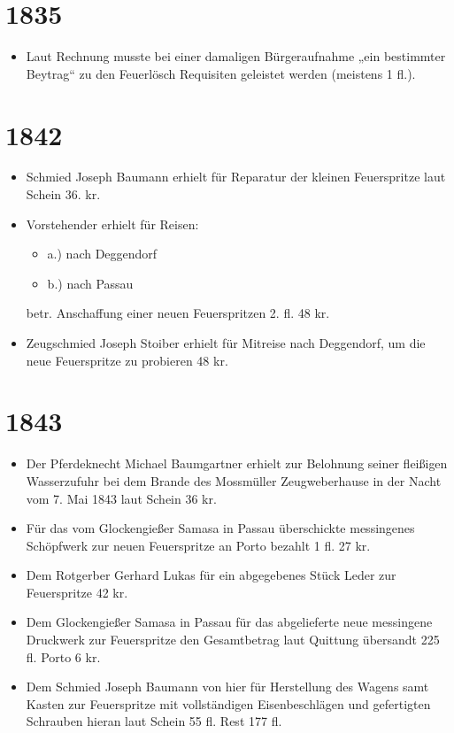 \documentclass[12pt,a4paper]{book}
\begin{document}
\section*{1835}

\begin{itemize}
\item Laut Rechnung musste bei einer damaligen Bürgeraufnahme „ein
bestimmter Beytrag“ zu den Feuerlösch Requisiten geleistet werden
(meistens 1 fl.).
\end{itemize}

\section*{1842}

\begin{itemize}
\item Schmied Joseph Baumann erhielt für Reparatur der kleinen
Feuerspritze laut Schein 36. kr.

\item Vorstehender erhielt für Reisen:

\begin{itemize}
\item a.) nach Deggendorf
\item b.) nach Passau
\end{itemize}

betr. Anschaffung einer neuen Feuerspritzen 2. fl. 48 kr.

\item  Zeugschmied Joseph Stoiber erhielt für Mitreise nach Deggendorf,
um die neue Feuerspritze zu probieren 48 kr.
\end{itemize}

\section*{1843}

\begin{itemize}
\item Der Pferdeknecht Michael Baumgartner erhielt zur Belohnung seiner
fleißigen Wasserzufuhr bei dem Brande des Mossmüller Zeugweberhause in
der Nacht vom 7. Mai 1843 laut Schein 36 kr.

\item Für das vom Glockengießer Samasa in Passau überschickte
messingenes Schöpfwerk zur neuen Feuerspritze an Porto bezahlt 1 fl. 27
kr.

\item Dem Rotgerber Gerhard Lukas für ein abgegebenes Stück Leder zur
Feuerspritze 42 kr.

\item Dem Glockengießer Samasa in Passau für das abgelieferte neue
messingene Druckwerk zur Feuerspritze den Gesamtbetrag laut Quittung
übersandt 225 fl. Porto 6 kr.

\item Dem Schmied Joseph Baumann von hier für Herstellung des Wagens
samt Kasten zur Feuerspritze mit vollständigen Eisenbeschlägen und
gefertigten Schrauben hieran laut Schein 55 fl. Rest 177 fl.
\end{itemize}
\end{document}
